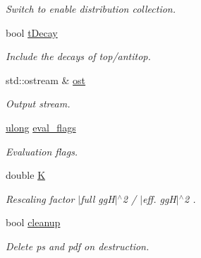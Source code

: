 \begin{DoxyCompactItemize}
\begin{DoxyCompactList}\small\item\em Switch to enable distribution collection. \end{DoxyCompactList}\item 
\hypertarget{classintegrand__par_a725bfa73c797c38c5575594d0ff53eb6}{}bool \hyperlink{classintegrand__par_a725bfa73c797c38c5575594d0ff53eb6}{t\+Decay}\label{classintegrand__par_a725bfa73c797c38c5575594d0ff53eb6}

\begin{DoxyCompactList}\small\item\em Include the decays of top/antitop. \end{DoxyCompactList}\item 
\hypertarget{classintegrand__par_ab817e73577da97cd660ad01761521d3b}{}std\+::ostream \& \hyperlink{classintegrand__par_ab817e73577da97cd660ad01761521d3b}{ost}\label{classintegrand__par_ab817e73577da97cd660ad01761521d3b}

\begin{DoxyCompactList}\small\item\em Output stream. \end{DoxyCompactList}\item 
\hypertarget{classintegrand__par_adb701c9d21e3b412032dca85ebcde090}{}\hyperlink{Global_8h_a1398ea0e48e059bf4db2f4bcd7eb31fa}{ulong} \hyperlink{classintegrand__par_adb701c9d21e3b412032dca85ebcde090}{eval\+\_\+flags}\label{classintegrand__par_adb701c9d21e3b412032dca85ebcde090}

\begin{DoxyCompactList}\small\item\em Evaluation flags. \end{DoxyCompactList}\item 
\hypertarget{classintegrand__par_afae7075055e10bd188d53fe2e1edd1e3}{}double \hyperlink{classintegrand__par_afae7075055e10bd188d53fe2e1edd1e3}{K}\label{classintegrand__par_afae7075055e10bd188d53fe2e1edd1e3}

\begin{DoxyCompactList}\small\item\em Rescaling factor $\vert$full gg\+H$\vert$$^\wedge$2 / $\vert$eff. gg\+H$\vert$$^\wedge$2 . \end{DoxyCompactList}\item 
\hypertarget{classintegrand__par_a1655b43b8c9e09a8bfbab014375aca49}{}bool \hyperlink{classintegrand__par_a1655b43b8c9e09a8bfbab014375aca49}{cleanup}\label{classintegrand__par_a1655b43b8c9e09a8bfbab014375aca49}

\begin{DoxyCompactList}\small\item\em Delete ps and pdf on destruction. \end{DoxyCompactList}\end{DoxyCompactItemize}


